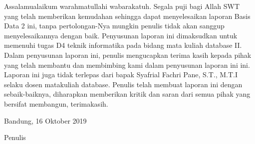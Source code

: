 \begin{acknowledgements}
Assalamualaikum warahmatullahi wabarakatuh. Segala puji bagi Allah SWT yang telah memberikan kemudahan sehingga dapat menyelesaikan laporan Basis Data 2 ini, tanpa pertolongan-Nya mungkin penulis tidak akan sanggup menyelesaikannya dengan baik. Penyusunan laporan ini dimaksudkan untuk memenuhi tugas D4 teknik informatika pada bidang mata kuliah database II. Dalam penyusunan laporan ini, penulis mengucapkan terima kasih kepada pihak yang telah membantu dan membimbing kami dalam penyusunan laporan ini ini. Laporan ini juga tidak terlepas dari bapak Syafrial Fachri Pane, S.T., M.T.I selaku dosen matakuliah database. Penulis telah membuat laporan ini dengan sebaik-baiknya, diharapkan memberikan kritik dan saran dari semua pihak yang bersifat membangun, terimakasih.

\begin{raggedleft}

Bandung, 16 Oktober 2019

Penulis

\end{raggedleft}

\end{acknowledgements}